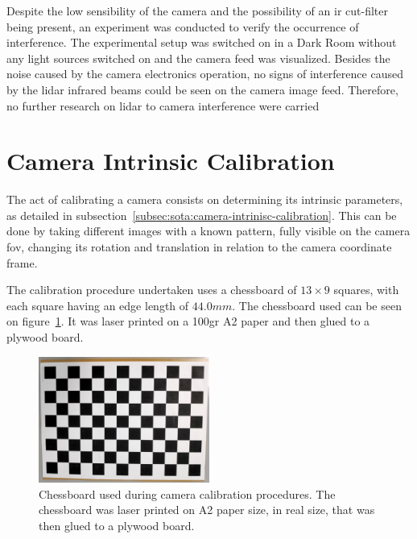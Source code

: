 Despite the low sensibility of the camera and the possibility of an \ac{ir} cut-filter being present, an experiment was conducted to verify the occurrence of interference. The experimental setup was switched on in a Dark Room without any light sources switched on and the camera feed was visualized. Besides the noise caused by the camera electronics operation, no signs of interference caused by the \ac{lidar} infrared beams could be seen on the camera image feed. Therefore, no further research on \ac{lidar} to camera interference were carried





\section{Camera Intrinsic Calibration}
\label{sec:calibration:camera}
The act of calibrating a camera consists on determining its intrinsic parameters, as detailed in subsection~\ref{subsec:sota:camera-intrinisc-calibration}. This can be done by taking different images with a known pattern, fully visible on the camera \ac{fov}, changing its rotation and translation in relation to the camera coordinate frame.

The calibration procedure undertaken uses a chessboard of $13 \times 9$ squares, with each square having an edge length of $44.0 mm$. The chessboard used can be seen on figure~\ref{fig:chessboard}. It was laser printed on a 100gr A2 paper and then glued to a plywood board.

\begin{figure}[H]
	\centering
	\includegraphics[width=0.5\textwidth]{img/experimental-setup/chessboard.jpg}
	\caption{Chessboard used during camera calibration procedures. The chessboard was laser printed on A2 paper size, in real size, that was then glued to a plywood board.}
	\label{fig:chessboard}
\end{figure}

